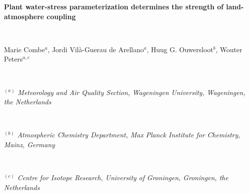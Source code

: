 \documentclass[10pt,a4paper,notitlepage,twoside]{article}
\begin{document}
\begin{center}
\large{\textbf{Plant water-stress parameterization determines the strength of land-atmosphere coupling}}

\ 

Marie Combe$^{a}$, Jordi Vil{\`a}-Guerau de Arellano$^{a}$, Huug G. Ouwersloot$^{b}$, Wouter Peters$^{a,c}$
\normalsize

\

\textit{$^{(a)}$ Meteorology and Air Quality Section, Wageningen University, Wageningen, the Netherlands}

\

\textit{$^{(b)}$ Atmospheric Chemistry Department, Max Planck Institute for Chemistry, Mainz, Germany}

\

\textit{$^{(c)}$ Centre for Isotope Research, University of Groningen, Groningen, the Netherlands}

\

\end{center}

\

\doublespacing %
\end{document}

